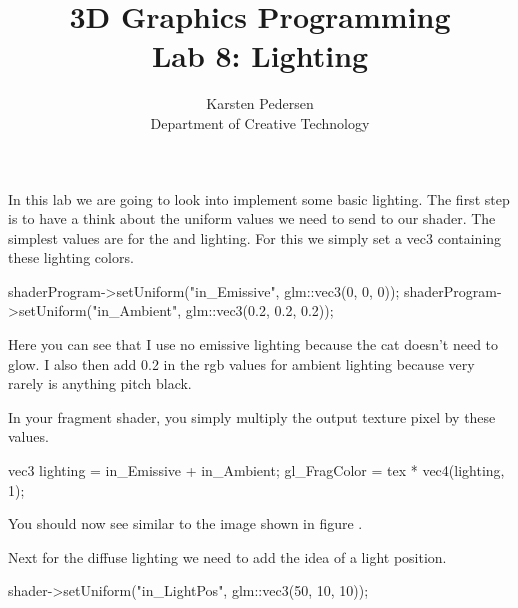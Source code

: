 \documentclass[10pt]{article}
\begin{document}
\title{3D Graphics Programming \\
  \large Lab 8: Lighting}

\author{Karsten Pedersen\\ Department of Creative Technology}
\maketitle

In this lab we are going to look into implement some basic lighting.
The first step is to have a think about the uniform values we need to
send to our shader.  The simplest values are for the 
and  lighting. For this we simply set a vec3 containing
these lighting colors.

\begin{Code}

shaderProgram->setUniform("in_Emissive", glm::vec3(0, 0, 0));
shaderProgram->setUniform("in_Ambient", glm::vec3(0.2, 0.2, 0.2));

\end{Code}

Here you can see that I use no emissive lighting because the cat doesn't need to glow.
I also then add 0.2 in the rgb values for ambient lighting because very rarely is anything pitch black.

In your fragment shader, you simply multiply the output texture pixel by these values.

\begin{Code}

vec3 lighting = in_Emissive + in_Ambient;
gl_FragColor = tex * vec4(lighting, 1);

\end{Code}

You should now see similar to the image shown in figure .


Next for the diffuse lighting we need to add the idea of a light position.

\begin{Code}

shader->setUniform("in_LightPos", glm::vec3(50, 10, 10));

\end{Code}
\end{document}
